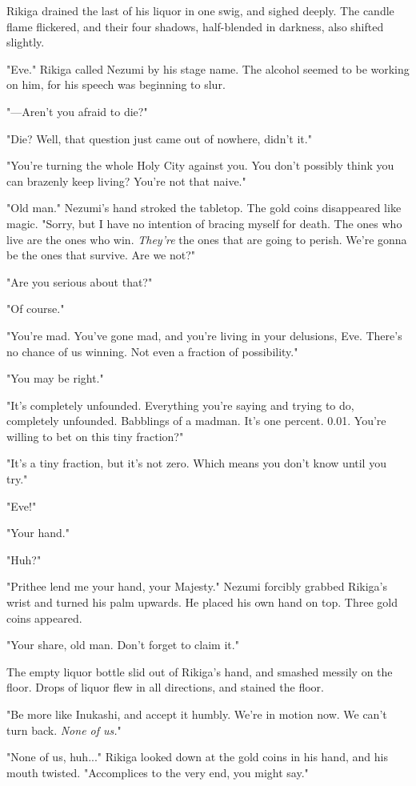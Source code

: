 Rikiga drained the last of his liquor in one swig, and sighed deeply.
The candle flame flickered, and their four shadows, half-blended in
darkness, also shifted slightly.

"Eve." Rikiga called Nezumi by his stage name. The alcohol seemed to be
working on him, for his speech was beginning to slur.

"---Aren't you afraid to die?"

"Die? Well, that question just came out of nowhere, didn't it."

"You're turning the whole Holy City against you. You don't possibly
think you can brazenly keep living? You're not that naive."

"Old man." Nezumi's hand stroked the tabletop. The gold coins
disappeared like magic. "Sorry, but I have no intention of bracing
myself for death. The ones who live are the ones who win. \emph{They're} the
ones that are going to perish. We're gonna be the ones that survive. Are
we not?"

"Are you serious about that?"

"Of course."

"You're mad. You've gone mad, and you're living in your delusions, Eve.
There's no chance of us winning. Not even a fraction of possibility."

"You may be right."

"It's completely unfounded. Everything you're saying and trying to do,
completely unfounded. Babblings of a madman. It's one percent. 0.01.
You're willing to bet on this tiny fraction?"

"It's a tiny fraction, but it's not zero. Which means you don't know
until you try."

"Eve!"

"Your hand."

"Huh?"

"Prithee lend me your hand, your Majesty." Nezumi forcibly grabbed
Rikiga's wrist and turned his palm upwards. He placed his own hand on
top. Three gold coins appeared.

"Your share, old man. Don't forget to claim it."

The empty liquor bottle slid out of Rikiga's hand, and smashed messily
on the floor. Drops of liquor flew in all directions, and stained the
floor.

"Be more like Inukashi, and accept it humbly. We're in motion now. We
can't turn back. \emph{None of us.}"

"None of us, huh..." Rikiga looked down at the gold coins in his hand,
and his mouth twisted. "Accomplices to the very end, you might say."

